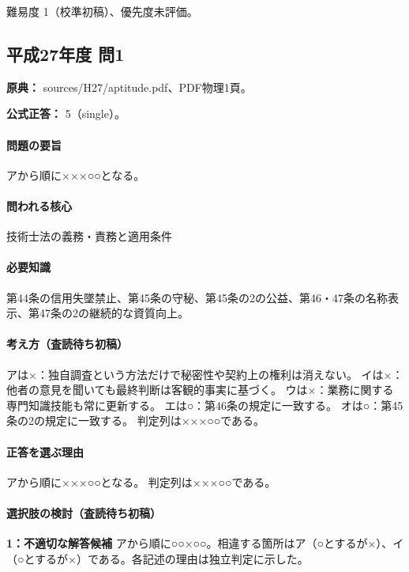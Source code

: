 \par 難易度 1（校準初稿）、優先度未評価。

\subsection{平成27年度 問1}
\label{q:h27-reg-apt-01}

\noindent\textbf{原典：} sources/H27/aptitude.pdf、PDF物理1頁。

\textbf{公式正答：} 5（single）。

\paragraph{問題の要旨} アから順に×××○○となる。

\paragraph{問われる核心} 技術士法の義務・責務と適用条件

\paragraph{必要知識} 第44条の信用失墜禁止、第45条の守秘、第45条の2の公益、第46・47条の名称表示、第47条の2の継続的な資質向上。

\paragraph{考え方（査読待ち初稿）} アは×：独自調査という方法だけで秘密性や契約上の権利は消えない。 イは×：他者の意見を聞いても最終判断は客観的事実に基づく。 ウは×：業務に関する専門知識技能も常に更新する。 エは○：第46条の規定に一致する。 オは○：第45条の2の規定に一致する。 判定列は×××○○である。

\paragraph{正答を選ぶ理由} アから順に×××○○となる。  判定列は×××○○である。

\paragraph{選択肢の検討（査読待ち初稿）}

\noindent\textbf{1：不適切な解答候補} アから順に○○×○○。相違する箇所はア（○とするが×）、イ（○とするが×）である。各記述の理由は独立判定に示した。\par

